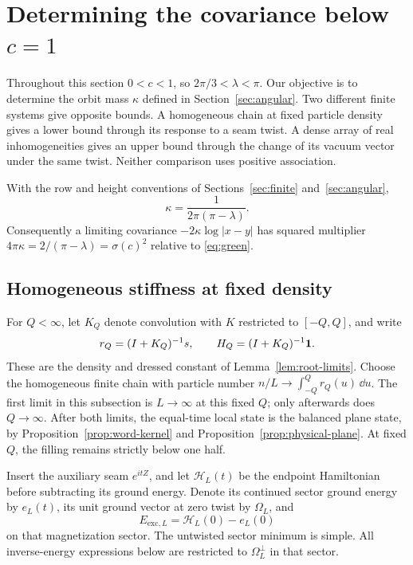 \section{Determining the covariance below \texorpdfstring{\(c=1\)}{c=1}}\label{sec:normalization}

Throughout this section \(0<c<1\), so \(2\pi/3<\lambda<\pi\).
Our objective is to determine the orbit mass \(\kappa\) defined in
Section~\ref{sec:angular}. Two different finite systems give opposite
bounds. A homogeneous chain at fixed particle density gives a lower
bound through its response to a seam twist. A dense array of real
inhomogeneities gives an upper bound through the change of its vacuum
vector under the same twist. Neither comparison uses positive association.

\begin{proposition}\label{prop:normalization}
With the row and height conventions of Sections~\ref{sec:finite}
and~\ref{sec:angular},
\begin{equation}\label{eq:kappa-value}
 \kappa=\frac1{2\pi(\pi-\lambda)}.
\end{equation}
Consequently a limiting covariance \(-2\kappa\log|x-y|\) has squared
multiplier \(4\pi\kappa=2/(\pi-\lambda)=\sigma(c)^2\) relative to
\eqref{eq:green}.
\end{proposition}

\subsection{Homogeneous stiffness at fixed density}

For \(Q<\infty\), let \(K_Q\) denote convolution with \(K\) restricted to
\([-Q,Q]\), and write
\[
 r_Q=(I+K_Q)^{-1}s,\qquad H_Q=(I+K_Q)^{-1}\mathbf1.
\]
These are the density and dressed constant of Lemma~\ref{lem:root-limits}.
Choose the homogeneous finite chain with particle number
\(n/L\to\int_{-Q}^{Q}r_Q(u)\,\dd u\). The first limit in this subsection
is \(L\to\infty\) at this fixed \(Q\); only afterwards does \(Q\to\infty\).
After both limits, the equal-time local state is the balanced plane
state, by Proposition~\ref{prop:word-kernel} and
Proposition~\ref{prop:physical-plane}. At fixed \(Q\), the filling
remains strictly below one half.

Insert the auxiliary seam \(e^{itZ}\), and let \(\mathcal H_L(t)\) be the
endpoint Hamiltonian before subtracting its ground energy. Denote its
continued sector ground energy by \(e_L(t)\), its unit ground vector at
zero twist by \(\Omega_L\), and
\[
 E_{\mathrm{exc},L}
   =\mathcal H_L(0)-e_L(0)
\]
on that magnetization sector. The untwisted sector minimum is simple.
All inverse-energy expressions below are restricted to
\(\Omega_L^\perp\) in that sector.

